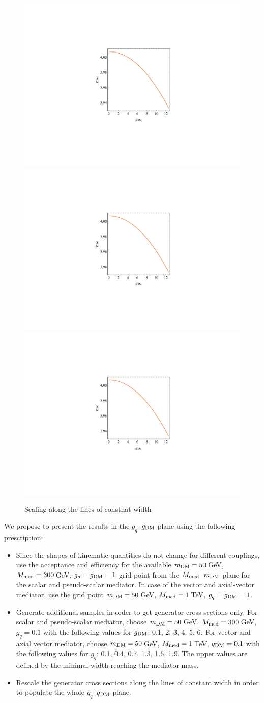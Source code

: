 \begin{figure}
\centering
\includegraphics[page=1, trim=310 200 310 200, clip, width=0.3\linewidth]{figures/monojet/rescalingexercise.pdf}
\includegraphics[page=2, trim=305 195 305 195, clip, width=0.3\linewidth]{figures/monojet/rescalingexercise.pdf}
\includegraphics[page=3, trim=300 190 300 190, clip, width=0.3\linewidth]{figures/monojet/rescalingexercise.pdf}
\caption{Scaling along the lines of constnat width}
\label{fig:monojet_scaling_constwidth}
\end{figure}

We propose to present the results in the $g_q$--$g_{\rm{DM}}$ plane using the following prescription:
\begin{itemize}
\item Since the shapes of kinematic quantities do not change for different couplings, use the acceptance and efficiency for the available $m_{\rm{DM}}=50$\,GeV, $M_{\rm{med}}=300$\,GeV, $g_q=g_{\rm{DM}}=1$ grid point from the $M_{\rm{med}}$--$m_{\rm{DM}}$ plane for the scalar and pseudo-scalar mediator. In case of the vector and axial-vector mediator, use the grid point $m_{\rm{DM}}=50$\,GeV, $M_{\rm{med}}=1$\,TeV, $g_q=g_{\rm{DM}}=1$.
\item Generate additional samples in order to get generator cross sections only. For scalar and pseudo-scalar mediator, choose $m_{\rm{DM}}=50$\,GeV, $M_{\rm{med}}=300$\,GeV, $g_q=0.1$ with the following values for $g_{\rm{DM}}$: 0.1, 2, 3, 4, 5, 6. For vector and axial vector mediator, choose $m_{\rm{DM}}=50$\,GeV, $M_{\rm{med}}=1$\,TeV, $g_{\rm{DM}}=0.1$ with the following values for $g_q$: 0.1, 0.4, 0.7, 1.3, 1.6, 1.9. The upper values are defined by the minimal width reaching the mediator mass.
\item Rescale the generator cross sections along the lines of constant width in order to populate the whole $g_q$--$g_{\rm{DM}}$ plane.
\end{itemize}

